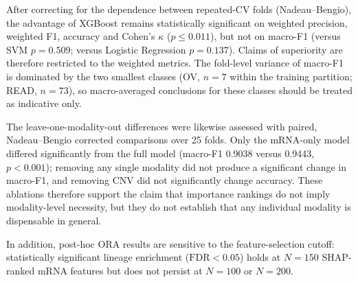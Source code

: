 After correcting for the dependence between repeated-CV folds
(Nadeau--Bengio), the advantage of XGBoost remains statistically significant on
weighted precision, weighted F1, accuracy and Cohen's $\kappa$ ($p \leq 0.011$),
but not on macro-F1 (versus SVM $p = 0.509$; versus Logistic Regression
$p = 0.137$). Claims of superiority are therefore restricted to the weighted
metrics. The fold-level variance of macro-F1 is dominated by the two smallest
classes (OV, $n = 7$ within the training partition; READ, $n = 73$), so
macro-averaged conclusions for these classes should be treated as indicative
only.

The leave-one-modality-out differences were likewise assessed with paired,
Nadeau--Bengio corrected comparisons over 25 folds. Only the mRNA-only model
differed significantly from the full model (macro-F1 0.9038 versus 0.9443,
$p < 0.001$); removing any single modality did not produce a significant change
in macro-F1, and removing CNV did not significantly change accuracy. These
ablations therefore support the claim that importance rankings do not imply
modality-level necessity, but they do not establish that any individual modality
is dispensable in general.

In addition, post-hoc ORA results are sensitive to the feature-selection cutoff:
statistically significant lineage enrichment ($\mathrm{FDR} < 0.05$) holds at
$N = 150$ SHAP-ranked mRNA features but does not persist at $N = 100$ or
$N = 200$.
